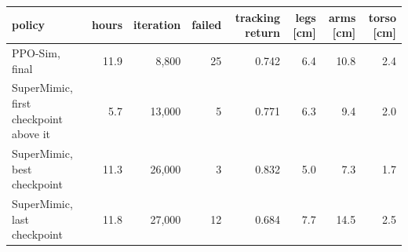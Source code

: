 \begin{tabular}{lrrrrrrr}\toprule
policy & hours & iteration & failed & tracking return & legs [cm] & arms [cm] & torso [cm] \\\midrule
PPO-Sim, final & 11.9 & 8,800 & 25 & 0.742 & 6.4 & 10.8 & 2.4 \\
SuperMimic, first checkpoint above it & 5.7 & 13,000 & 5 & 0.771 & 6.3 & 9.4 & 2.0 \\
SuperMimic, best checkpoint & 11.3 & 26,000 & 3 & 0.832 & 5.0 & 7.3 & 1.7 \\
SuperMimic, last checkpoint & 11.8 & 27,000 & 12 & 0.684 & 7.7 & 14.5 & 2.5 \\
\bottomrule\end{tabular}
